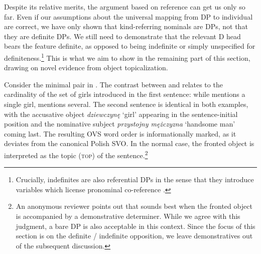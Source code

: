 \documentclass[output=paper,
colorlinks,
citecolor=brown,
newtxmath
]{langscibook}
\begin{document}
\ea {}
\label{ex:bookshelf_1}

 \label{ex:bookshelf_2}
\z \z

\noindent
Despite its relative merits, the argument based on reference can get us only so far. Even if our assumptions about the universal mapping from DP to individual are correct, we have only shown that kind-referring nominals are DPs, not that they are definite DPs. We still need to demonstrate that the relevant D head bears the feature definite, as opposed to being indefinite or simply unspecified for definiteness.\footnote{Crucially, indefinites are also referential DPs in the sense that they introduce variables which license pronominal co-reference \citep{Heim1982, Kamp.Reyle1993}.} This is what we aim to show in the remaining part of this section, drawing on novel evidence from object topicalization.

Consider the minimal pair in . The contrast between  and  relates to the cardinality of the set of girls introduced in the first sentence: while  mentions a single girl,  mentions several. The second sentence is identical in both examples, with the accusative object \textit{dziewczynę} `girl' appearing in the sentence-initial position and the nominative subject \textit{przystojny mężczyzna} `handsome man' coming last. The resulting OVS word order is informationally marked, as it deviates from the canonical Polish SVO. In the normal case, the fronted object is interpreted as the topic (\textsc{top}) of the sentence.\footnote{An anonymous reviewer points out that  sounds best when the fronted object is accompanied by a demonstrative determiner. While we agree with this judgment, a bare DP is also acceptable in this context. Since the focus of this section is on the definite / indefinite opposition, we leave demonstratives out of the subsequent discussion.}
\largerpage[-1] %
\end{document}
